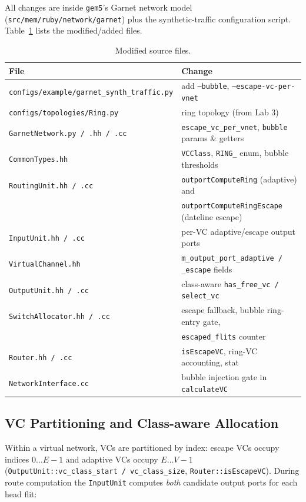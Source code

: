 \documentclass[11pt,a4paper]{article}
\begin{document}
All changes are inside \texttt{gem5}'s Garnet network model
(\texttt{src/mem/ruby/network/garnet}) plus the synthetic-traffic configuration
script.  Table~\ref{tab:files} lists the modified/added files.

\begin{table}[H]
  \centering
  \caption{Modified source files.}
  \label{tab:files}
  \small
  \begin{tabular}{@{}ll@{}}
    \toprule
    File & Change \\
    \midrule
    \texttt{configs/example/garnet\_synth\_traffic.py} & add \texttt{--bubble}, \texttt{--escape-vc-per-vnet} \\
    \texttt{configs/topologies/Ring.py} & ring topology (from Lab 3) \\
    \texttt{GarnetNetwork.py / .hh / .cc} & \texttt{escape\_vc\_per\_vnet}, \texttt{bubble} params \& getters \\
    \texttt{CommonTypes.hh} & \texttt{VCClass}, \texttt{RING\_} enum, bubble thresholds \\
    \texttt{RoutingUnit.hh / .cc} & \texttt{outportComputeRing} (adaptive) and \\
                    & \texttt{outportComputeRingEscape} (dateline escape) \\
    \texttt{InputUnit.hh / .cc} & per-VC adaptive/escape output ports \\
    \texttt{VirtualChannel.hh} & \texttt{m\_output\_port\_adaptive / \_escape} fields \\
    \texttt{OutputUnit.hh / .cc} & class-aware \texttt{has\_free\_vc / select\_vc} \\
    \texttt{SwitchAllocator.hh / .cc} & escape fallback, bubble ring-entry gate, \\
                    & \texttt{escaped\_flits} counter \\
    \texttt{Router.hh / .cc} & \texttt{isEscapeVC}, ring-VC accounting, stat \\
    \texttt{NetworkInterface.cc} & bubble injection gate in \texttt{calculateVC} \\
    \bottomrule
  \end{tabular}
\end{table}

\subsection{VC Partitioning and Class-aware Allocation}
\label{sec:impl:escape}
Within a virtual network, VCs are partitioned by index:
escape VCs occupy indices $0 \ldots E-1$ and adaptive VCs occupy $E \ldots V-1$
(\texttt{OutputUnit::vc\_class\_start / vc\_class\_size},
\texttt{Router::isEscapeVC}).  During route computation the \texttt{InputUnit}
computes \emph{both} candidate output ports for each head flit:
\end{document}
